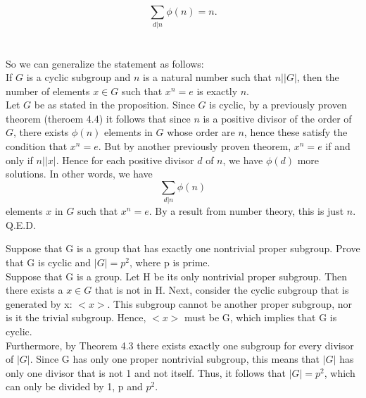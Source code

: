 \documentclass{article}
\begin{document}
$$\sum_{d|n}\phi(n) = n.$$ \\
\\
So we can generalize the statement as follows:\\
If $G$ is a cyclic subgroup and $n$ is a natural number such that $n||G|$, then the number of elements $x\in G$ such that $x^n = e$ is exactly $n$.\\


 Let $G$ be as stated in the proposition. Since $G$ is cyclic, by a previously proven theorem (theroem 4.4) it follows that since $n$ is a positive divisor of the order of $G$, there exists $\phi(n)$ elements in $G$ whose order are $n$, hence these satisfy the condition that $x^{n} = e$. But by another previously proven theorem, $x^n = e$ if and only if $n||x|$. Hence for each positive divisor $d$ of $n$, we have $\phi(d)$ more solutions. In other words, we have 
$$\sum_{d|n}\phi(n)$$ elements $x$ in $G$ such that $x^n = e$. By a result from number theory, this is just $n$. Q.E.D.

 Suppose that G is a group that has exactly one nontrivial proper subgroup. Prove that G is cyclic and $|G|=p^2$, where p is prime. \\

 Suppose that G is a group. Let H be its only nontrivial proper subgroup. Then there exists a $x\in G$ that is not in H. Next, consider the cyclic subgroup that is generated by x:  $<x>$. This subgroup cannot be another proper subgroup, nor is it the trivial subgroup. Hence, $<x>$ must be G, which implies that G is cyclic. \\
Furthermore, by Theorem 4.3 there exists exactly one subgroup for every divisor of $|G|$. Since G has only one proper nontrivial subgroup, this means that $|G|$ has only one divisor that is not 1 and not itself. Thus, it follows that $|G|=p^2$, which can only be divided by 1, p and $p^2$.
\\
\end{document}
